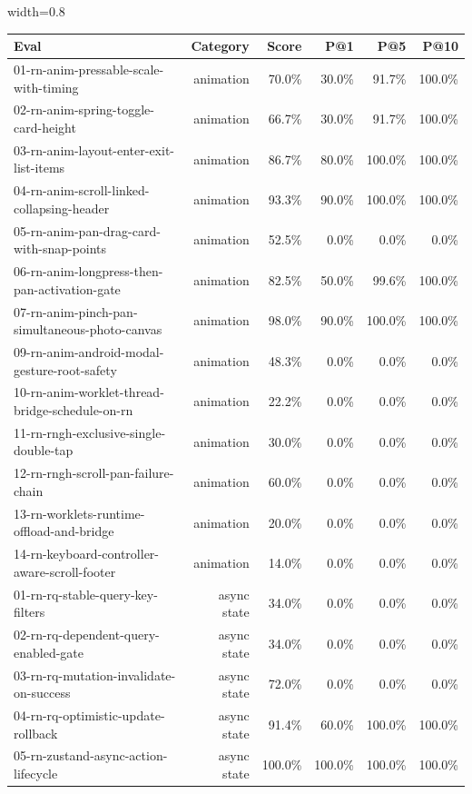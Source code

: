 \begin{table}[htbp]
\centering
\begin{adjustbox}{width=0.8\textwidth}
\begin{tabular}{lrrrrr}
\toprule
Eval & Category & Score & P@1 & P@5 & P@10 \\
\midrule
01-rn-anim-pressable-scale-with-timing & animation & 70.0\% & 30.0\% & 91.7\% & 100.0\% \\
02-rn-anim-spring-toggle-card-height & animation & 66.7\% & 30.0\% & 91.7\% & 100.0\% \\
03-rn-anim-layout-enter-exit-list-items & animation & 86.7\% & 80.0\% & 100.0\% & 100.0\% \\
04-rn-anim-scroll-linked-collapsing-header & animation & 93.3\% & 90.0\% & 100.0\% & 100.0\% \\
05-rn-anim-pan-drag-card-with-snap-points & animation & 52.5\% & 0.0\% & 0.0\% & 0.0\% \\
06-rn-anim-longpress-then-pan-activation-gate & animation & 82.5\% & 50.0\% & 99.6\% & 100.0\% \\
07-rn-anim-pinch-pan-simultaneous-photo-canvas & animation & 98.0\% & 90.0\% & 100.0\% & 100.0\% \\
09-rn-anim-android-modal-gesture-root-safety & animation & 48.3\% & 0.0\% & 0.0\% & 0.0\% \\
10-rn-anim-worklet-thread-bridge-schedule-on-rn & animation & 22.2\% & 0.0\% & 0.0\% & 0.0\% \\
11-rn-rngh-exclusive-single-double-tap & animation & 30.0\% & 0.0\% & 0.0\% & 0.0\% \\
12-rn-rngh-scroll-pan-failure-chain & animation & 60.0\% & 0.0\% & 0.0\% & 0.0\% \\
13-rn-worklets-runtime-offload-and-bridge & animation & 20.0\% & 0.0\% & 0.0\% & 0.0\% \\
14-rn-keyboard-controller-aware-scroll-footer & animation & 14.0\% & 0.0\% & 0.0\% & 0.0\% \\
01-rn-rq-stable-query-key-filters & async state & 34.0\% & 0.0\% & 0.0\% & 0.0\% \\
02-rn-rq-dependent-query-enabled-gate & async state & 34.0\% & 0.0\% & 0.0\% & 0.0\% \\
03-rn-rq-mutation-invalidate-on-success & async state & 72.0\% & 0.0\% & 0.0\% & 0.0\% \\
04-rn-rq-optimistic-update-rollback & async state & 91.4\% & 60.0\% & 100.0\% & 100.0\% \\
05-rn-zustand-async-action-lifecycle & async state & 100.0\% & 100.0\% & 100.0\% & 100.0\% \\

\end{tabular}
\end{adjustbox}
\end{table}
